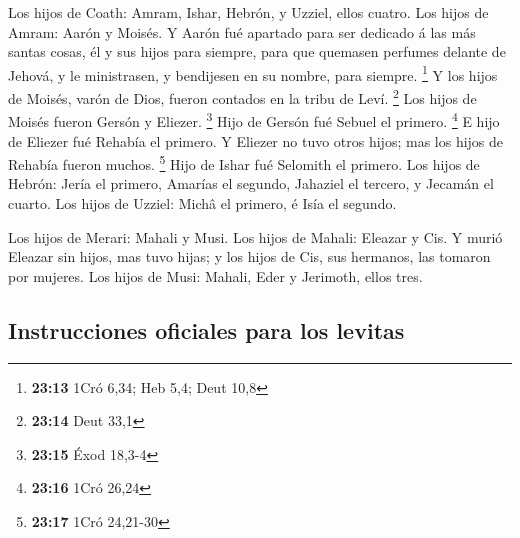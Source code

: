  Los hijos de Coath: Amram, Ishar, Hebrón, y Uzziel,
ellos cuatro.  Los hijos de Amram: Aarón y Moisés. Y
Aarón fué apartado para ser dedicado á las más santas cosas, él y sus
hijos para siempre, para que quemasen perfumes delante de Jehová, y le
ministrasen, y bendijesen en su nombre, para siempre. \footnote{\textbf{23:13}
  1Cró 6,34; Heb 5,4; Deut 10,8}  Y los hijos de Moisés,
varón de Dios, fueron contados en la tribu de Leví. \footnote{\textbf{23:14}
  Deut 33,1}  Los hijos de Moisés fueron Gersón y
Eliezer. \footnote{\textbf{23:15} Éxod 18,3-4}  Hijo de
Gersón fué Sebuel el primero. \footnote{\textbf{23:16} 1Cró 26,24}
 E hijo de Eliezer fué Rehabía el primero. Y Eliezer no
tuvo otros hijos; mas los hijos de Rehabía fueron muchos. \footnote{\textbf{23:17}
  1Cró 24,21-30}  Hijo de Ishar fué Selomith el primero.
 Los hijos de Hebrón: Jería el primero, Amarías el
segundo, Jahaziel el tercero, y Jecamán el cuarto.  Los
hijos de Uzziel: Michâ el primero, é Isía el segundo.

 Los hijos de Merari: Mahali y Musi. Los hijos de Mahali:
Eleazar y Cis.  Y murió Eleazar sin hijos, mas tuvo
hijas; y los hijos de Cis, sus hermanos, las tomaron por mujeres.
 Los hijos de Musi: Mahali, Eder y Jerimoth, ellos tres.

\hypertarget{instrucciones-oficiales-para-los-levitas}{%
\subsection{Instrucciones oficiales para los
levitas}\label{instrucciones-oficiales-para-los-levitas}}

